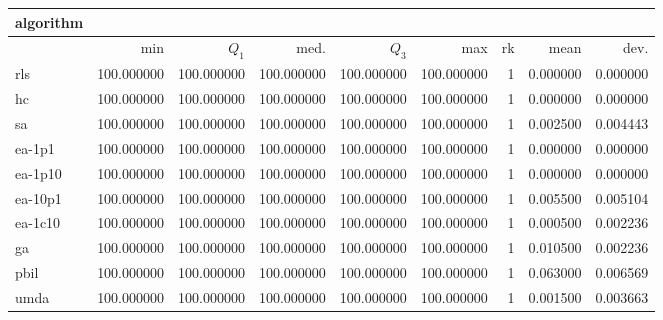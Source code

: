 \begin{tabular}{@{}l*{5}{>{{}}N{3}{0}}>{{}}N{2}{0}N{1}{3}N{1}{3}@{}}
\toprule
{algorithm} &  &  \\
\midrule
& {min} & {$Q_1$} & {med.} & {$Q_3$} & {max} & {rk} & {mean} & {dev.} \\
\midrule
rls & {\color{blue}} 100.000000 & {\color{blue}} 100.000000 & {\color{blue}} 100.000000 & {\color{blue}} 100.000000 & {\color{blue}} 100.000000 & 1 & 0.000000 & 0.000000 \\
 hc & {\color{blue}} 100.000000 & {\color{blue}} 100.000000 & {\color{blue}} 100.000000 & {\color{blue}} 100.000000 & {\color{blue}} 100.000000 & 1 & 0.000000 & 0.000000 \\
 sa & {\color{blue}} 100.000000 & {\color{blue}} 100.000000 & {\color{blue}} 100.000000 & {\color{blue}} 100.000000 & {\color{blue}} 100.000000 & 1 & 0.002500 & 0.004443 \\
 ea-1p1 & {\color{blue}} 100.000000 & {\color{blue}} 100.000000 & {\color{blue}} 100.000000 & {\color{blue}} 100.000000 & {\color{blue}} 100.000000 & 1 & 0.000000 & 0.000000 \\
 ea-1p10 & {\color{blue}} 100.000000 & {\color{blue}} 100.000000 & {\color{blue}} 100.000000 & {\color{blue}} 100.000000 & {\color{blue}} 100.000000 & 1 & 0.000000 & 0.000000 \\
 ea-10p1 & {\color{blue}} 100.000000 & {\color{blue}} 100.000000 & {\color{blue}} 100.000000 & {\color{blue}} 100.000000 & {\color{blue}} 100.000000 & 1 & 0.005500 & 0.005104 \\
 ea-1c10 & {\color{blue}} 100.000000 & {\color{blue}} 100.000000 & {\color{blue}} 100.000000 & {\color{blue}} 100.000000 & {\color{blue}} 100.000000 & 1 & 0.000500 & 0.002236 \\
 ga & {\color{blue}} 100.000000 & {\color{blue}} 100.000000 & {\color{blue}} 100.000000 & {\color{blue}} 100.000000 & {\color{blue}} 100.000000 & 1 & 0.010500 & 0.002236 \\
 pbil & {\color{blue}} 100.000000 & {\color{blue}} 100.000000 & {\color{blue}} 100.000000 & {\color{blue}} 100.000000 & {\color{blue}} 100.000000 & 1 & 0.063000 & 0.006569 \\
 umda & {\color{blue}} 100.000000 & {\color{blue}} 100.000000 & {\color{blue}} 100.000000 & {\color{blue}} 100.000000 & {\color{blue}} 100.000000 & 1 & 0.001500 & 0.003663 \\
 \bottomrule
\end{tabular}
